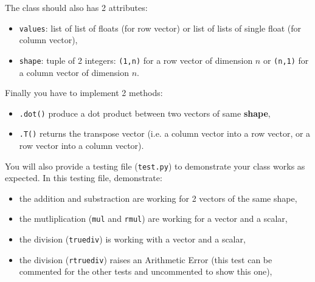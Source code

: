 \documentclass{42-en}
\begin{document}
The class should also has 2 attributes:
\begin{itemize}
  \item \texttt{values}: list of list of floats (for row vector) or list of lists of single float (for column vector),
  \item \texttt{shape}: tuple of 2 integers: \texttt{(1,n)} for a row vector of dimension $n$
  or \texttt{(n,1)} for a column vector of dimension $n$. 
\end{itemize}

      
Finally you have to implement 2 methods: 
\begin{itemize}
  \item \texttt{.dot()} produce a dot product between two vectors of same \textbf{shape},
  \item \texttt{.T()} returns the transpose vector (i.e. a column vector into a row vector, or a row vector into a column vector).
\end{itemize}

You will also provide a testing file (\texttt{test.py}) to demonstrate your class
works as expected. In this testing file, demonstrate:
\begin{itemize}
  \item the addition and substraction are working for 2 vectors of the same shape,
  \item the mutliplication (\texttt{mul} and \texttt{rmul}) are working for a vector and a scalar,
  \item the division (\texttt{truediv}) is working with a vector and a scalar,
  \item the division (\texttt{rtruediv}) raises an Arithmetic Error (this test can be commented for the other tests and uncommented to show this one),
\end{itemize}

\end{document}
